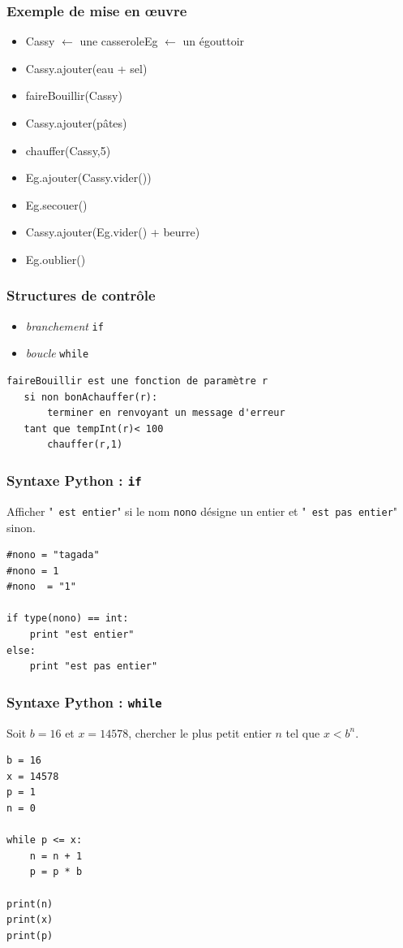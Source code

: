 \begin{frame}
  \frametitle{Exemple de mise en \oe{}uvre}
  \begin{itemize}
    \item Cassy $\leftarrow$ une casserole\newline Eg $\leftarrow$ un égouttoir
    \item Cassy.ajouter(eau + sel)
    \item faireBouillir(Cassy)
    \item Cassy.ajouter(pâtes)
    \item chauffer(Cassy,5)
    \item Eg.ajouter(Cassy.vider())
    \item Eg.secouer()
    \item Cassy.ajouter(Eg.vider() + beurre)
    \item Eg.oublier()
  \end{itemize}
\end{frame}

\begin{frame}[fragile]
  \frametitle{Structures de contrôle}
\begin{itemize}
  \item \emph{branchement} \texttt{if} 
  \item \emph{boucle} \texttt{while} 
\end{itemize}
\begin{verbatim}
faireBouillir est une fonction de paramètre r
   si non bonAchauffer(r):
       terminer en renvoyant un message d'erreur
   tant que tempInt(r)< 100
       chauffer(r,1)
\end{verbatim}
\end{frame}

\begin{frame}[fragile]
  \frametitle{Syntaxe Python : \texttt{if}}
  Afficher "\texttt{ est entier}" si le nom \texttt{nono} désigne un entier et "\texttt{ est pas entier}" sinon.
\begin{verbatim}
#nono = "tagada"
#nono = 1
#nono  = "1"

if type(nono) == int:
    print "est entier"
else:
    print "est pas entier"
\end{verbatim}
\end{frame}

\begin{frame}[fragile]
  \frametitle{Syntaxe Python : \texttt{while}}
  Soit $b=16$ et $x=14578$, chercher le plus petit entier $n$ tel que $x < b^n$.
\begin{verbatim}
b = 16 
x = 14578
p = 1
n = 0

while p <= x:
    n = n + 1
    p = p * b
    
print(n)
print(x)
print(p)
\end{verbatim}
\end{frame}

